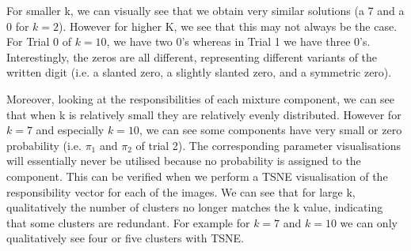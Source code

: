 \documentclass[12pt]{article}
\begin{document}
\begin{enumerate}
{%

For smaller k, we can visually see that we obtain very similar solutions (a 7 and a 0 for $k=2$). However for higher K, we see that this may not always be the case. For Trial 0 of $k=10$, we have two 0's whereas in Trial 1 we have three 0's. Interestingly, the zeros are all different, representing different variants of the written digit (i.e. a slanted zero, a slightly slanted zero, and a symmetric zero).

\newpage

Moreover, looking at the responsibilities of each mixture component, we can see that when k is relatively small they are relatively evenly distributed. However for $k=7$ and especially $k=10$, we can see some components have very small or zero probability (i.e. $\pi_1$ and $\pi_2$ of trial 2). The corresponding parameter visualisations will essentially never be utilised because no probability is assigned to the component. This can be verified when we perform a TSNE visualisation of the responsibility vector for each of the images. We can see that for large k, qualitatively the number of clusters no longer matches the k value, indicating that some clusters are redundant. For example for $k=7$ and $k=10$ we can only qualitatively see four or five clusters with TSNE.

}
\end{enumerate}
\end{document}
